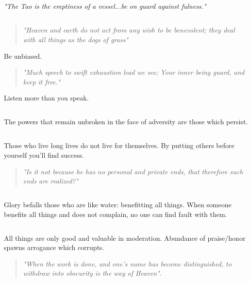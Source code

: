 \documentclass[a4paper, 10pt]{article}
\begin{document}
\subsection{}
\textit{"The Tao is the emptiness of a vessel...be on guard against fulness."}
\subsection{}
\begin{quote}
	\centering
	\textit{"Heaven and earth do not act from any wish to be benevolent; they deal with all things as the dogs of grass"}
\end{quote}
Be unbiased.
\begin{quote}
	\centering
	\textit{"Much speech to swift exhaustion lead we see; Your inner being guard, and keep it free."}
\end{quote}
Listen more than you speak.
\subsection{}
The powers that remain unbroken in the face of adversity are those which persist.
\subsection{}
Those who live long lives do not live for themselves. By putting others before yourself you'll find success.
\begin{quote}
	\centering
	\textit{"Is it not because he has no personal and private ends, that therefore such ends are realized?"}
\end{quote}
\subsection{}
Glory befalls those who are like water: benefitting all things. When someone benefits all things and does not complain, no one can find fault with them.
\subsection{}
All things are only good and valuable in moderation. Abundance of praise/honor spawns arrogance which corrupts.
\begin{quote}
	\centering
	\textit{"When the work is done, and one's name has become distinguished, to withdraw into obscurity is the way of Heaven".}
\end{quote}
\end{document}
